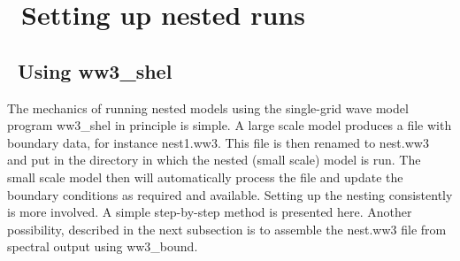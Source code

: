 \pagestyle{myheadings} \setcounter{page}{1} \setcounter{footnote}{0}

\section{~Setting up nested runs} \label{app:nest}
\newcounters 
\vssub
\subsection{~Using {\file ww3\_shel}}
\vssub

The mechanics of running nested models using the single-grid wave model
program {\file ww3\_shel} in principle is simple. A large scale model produces
a file with boundary data, for instance {\file nest1.ww3}. This file is then
renamed to {\file nest.ww3} and put in the directory in which the nested
(small scale) model is run. The small scale model then will automatically
process the file and update the boundary conditions as required and
available. Setting up the nesting consistently is more involved. A simple
step-by-step method is presented here. Another possibility, described in the
next subsection is to assemble the {\file nest.ww3} file from spectral output
using {\code ww3\_bound}.


